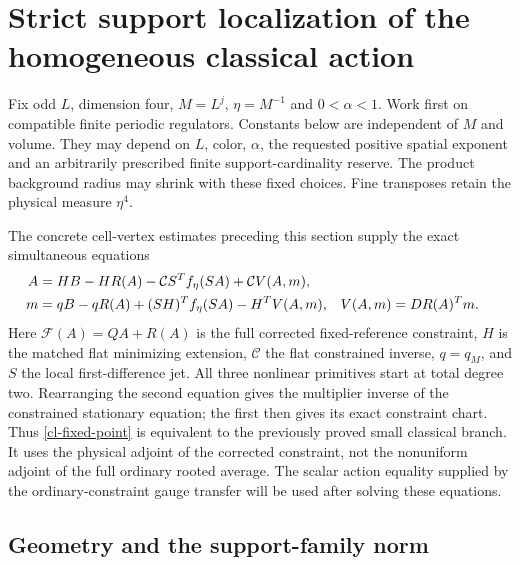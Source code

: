 \section{Strict support localization of the homogeneous classical action}
\label{cl-section}

Fix odd $L$, dimension four, $M=L^j$, $\eta=M^{-1}$ and
$0<\alpha<1$. Work first on compatible finite periodic regulators.
Constants below are independent of $M$ and volume. They may depend on
$L$, color, $\alpha$, the requested positive spatial exponent and an
arbitrarily prescribed finite support-cardinality reserve. The product
background radius may shrink with these fixed choices. Fine transposes
retain the physical measure $\eta^4$.

The concrete cell-vertex estimates preceding this section supply the
exact simultaneous equations
\begin{align}
 A&=HB-HR(A)-\mathcal C S^T f_\eta(SA)
                         +\mathcal C V(A,m),\notag\\
 m&=qB-qR(A)+(SH)^T f_\eta(SA)-H^T V(A,m),
 &V(A,m)&=DR(A)^Tm.                                      \label{cl-fixed-point}
\end{align}
Here $\mathcal F(A)=QA+R(A)$ is the full corrected fixed-reference
constraint, $H$ is the matched flat minimizing extension,
$\mathcal C$ the flat constrained inverse, $q=q_M$, and $S$ the local
first-difference jet. All three nonlinear primitives start at total
degree two. Rearranging the second equation gives the multiplier inverse
of the constrained stationary equation; the first then gives its exact
constraint chart. Thus \eqref{cl-fixed-point} is equivalent to the
previously proved small classical branch. It uses the physical adjoint
of the corrected constraint, not the nonuniform adjoint of the full
ordinary rooted average. The scalar action equality supplied by the
ordinary-constraint gauge transfer will be used after solving these
equations.

\subsection{Geometry and the support-family norm}
\label{cl-geometry-section}

